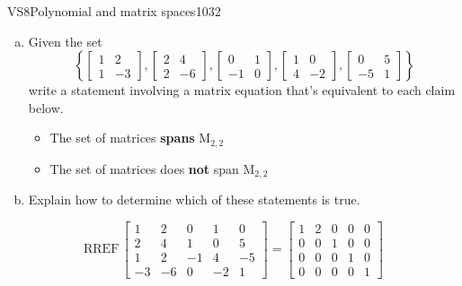 \begin{exercise}{VS8}{Polynomial and matrix spaces}{1032} 
\begin{exerciseStatement} 

\begin{enumerate}[(a)]
\item  

 Given the set \[\left\{ \left[\begin{array}{cc}
1 & 2 \\
1 & -3
\end{array}\right] , \left[\begin{array}{cc}
2 & 4 \\
2 & -6
\end{array}\right] , \left[\begin{array}{cc}
0 & 1 \\
-1 & 0
\end{array}\right] , \left[\begin{array}{cc}
1 & 0 \\
4 & -2
\end{array}\right] , \left[\begin{array}{cc}
0 & 5 \\
-5 & 1
\end{array}\right] \right\}\] write a statement involving a matrix equation that's equivalent to each claim below. 

 

\begin{itemize}
\item  

 The set of matrices \textbf{spans} \(\mathrm{M}_{2,2}\) 

 
\item  

 The set of matrices does \textbf{not} span \(\mathrm{M}_{2,2}\) 

 
\end{itemize}

     
\item  

 Explain how to determine which of these statements is true. 

 
\end{enumerate}

     \end{exerciseStatement}
 \begin{exerciseAnswer} 

 \[
\mathrm{RREF}\, \left[\begin{array}{ccccc}
1 & 2 & 0 & 1 & 0 \\
2 & 4 & 1 & 0 & 5 \\
1 & 2 & -1 & 4 & -5 \\
-3 & -6 & 0 & -2 & 1
\end{array}\right] = \left[\begin{array}{ccccc}
1 & 2 & 0 & 0 & 0 \\
0 & 0 & 1 & 0 & 0 \\
0 & 0 & 0 & 1 & 0 \\
0 & 0 & 0 & 0 & 1
\end{array}\right]
            \] 


\end{exerciseAnswer}
\end{exercise}
